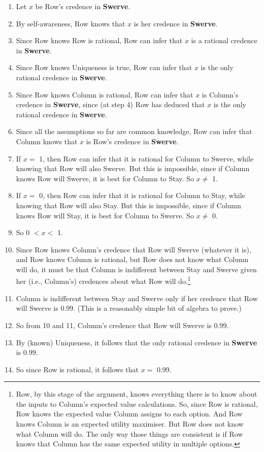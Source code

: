 \documentclass[
  11pt,
]{article}
\providecommand{\tightlist}{%
  \setlength{\itemsep}{0pt}\setlength{\parskip}{0pt}}
\begin{document}
\begin{enumerate}
\def\labelenumi{\arabic{enumi}.}
\tightlist
\item
  Let \(x\) be Row's credence in \textbf{Swerve}.
\item
  By self-awareness, Row knows that \(x\) is her credence in \textbf{Swerve}.
\item
  Since Row knows Row is rational, Row can infer that \(x\) is a rational credence in \textbf{Swerve}.
\item
  Since Row knows Uniqueness is true, Row can infer that \(x\) is the only rational credence in \textbf{Swerve}.
\item
  Since Row knows Column is rational, Row can infer that \(x\) is Column's credence in \textbf{Swerve}, since (at step 4) Row has deduced that \(x\) is the only rational credence in \textbf{Swerve}.
\item
  Since all the assumptions so far are common knowledge, Row can infer that Column knows that \(x\) is Row's credence in \textbf{Swerve}.
\item
  If \(x =\) 1, then Row can infer that it is rational for Column to Swerve, while knowing that Row will also Swerve. But this is impossible, since if Column knows Row will Swerve, it is best for Column to Stay. So \(x \neq\) 1.
\item
  If \(x =\) 0, then Row can infer that it is rational for Column to Stay, while knowing that Row will also Stay. But this is impossible, since if Column knows Row will Stay, it is best for Column to Swerve. So \(x \neq\) 0.
\item
  So 0 \(< x <\) 1.
\item
  Since Row knows Column's credence that Row will Swerve (whatever it is), and Row knows Column is rational, but Row does not know what Column will do, it must be that Column is indifferent between Stay and Swerve given her (i.e., Column's) credences about what Row will do.\footnote{Row, by this stage of the argument, knows everything there is to know about the inputs to Column's expected value calculations. So, since Row is rational, Row knows the expected value Column assigns to each option. And Row knows Column is an expected utility maximiser. But Row does not know what Column will do. The only way those things are consistent is if Row knows that Column has the same expected utility in multiple options.}
\item
  Column is indifferent between Stay and Swerve only if her credence that Row will Swerve is 0.99. (This is a reasonably simple bit of algebra to prove.)
\item
  So from 10 and 11, Column's credence that Row will Swerve is 0.99.
\item
  By (known) Uniqueness, it follows that the only rational credence in \textbf{Swerve} is 0.99.
\item
  So since Row is rational, it follows that \(x =\) 0.99.
\end{enumerate}
\end{document}

